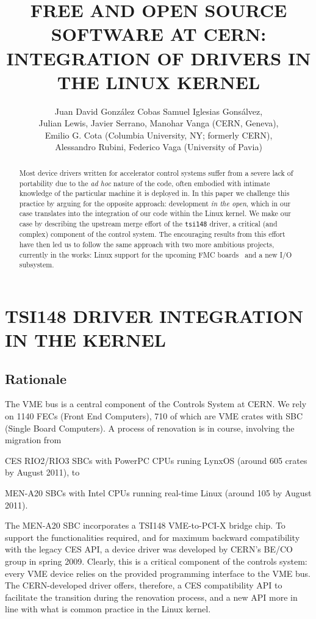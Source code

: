 \documentclass{JAC2003}
\title{%
    FREE AND OPEN SOURCE SOFTWARE AT CERN:\\
    INTEGRATION OF DRIVERS IN THE LINUX KERNEL}
\author{%
	Juan David Gonz\'alez Cobas Samuel Iglesias Gons\'alvez,\\
	Julian Lewis, Javier Serrano, Manohar Vanga (CERN, Geneva),\\ 
	Emilio G. Cota (Columbia University, NY; formerly CERN), \\
	Alessandro Rubini, Federico Vaga (University of Pavia)}
\begin{document}
\maketitle
\begin{abstract}
    Most device drivers written for accelerator control systems suffer from a
    severe lack of portability due to the \emph{ad hoc} nature of the code,
    often embodied with intimate knowledge of the particular machine it is
    deployed in.
    In this paper we challenge this practice by arguing for the opposite
    approach: development \emph{in the open}, which in our case translates
    into the integration of our code within the Linux kernel. We make our
    case by describing the upstream merge effort of the \texttt{tsi148}
    driver, a critical (and complex) component of the control system.
    The encouraging results from this effort have then led us to follow the
    same approach with two more ambitious projects, currently in the works:
    Linux support for the upcoming FMC boards~\cite{fpga-fmc,vita-fmc}
    and a new I/O subsystem.
\end{abstract}


\section{TSI148 DRIVER INTEGRATION IN THE KERNEL}
\subsection{Rationale}
The VME bus is a central component of the Controls System at CERN. We rely
on 1140 FECs (Front End Computers), 710 of which are VME crates with SBC
(Single Board Computers). A process of renovation is in course, involving
the migration from
\begin{Itemize}
\item CES RIO2/RIO3 SBCs with PowerPC CPUs runing LynxOS (around 605
    crates by August 2011), to
\item MEN-A20 SBCs with Intel CPUs running real-time Linux (around 105 by
    August 2011).
\end{Itemize}

The MEN-A20 SBC incorporates a TSI148 VME-to-PCI-X bridge chip.  To support
the functionalities required, and for maximum backward compatibility with
the legacy CES API, a device driver was developed by CERN's BE/CO group in
spring 2009. Clearly, this is a critical component of the controls system:
every VME device relies on the provided programming interface to the VME
bus. The CERN-developed driver offers, therefore, a CES compatibility API
to facilitate the transition during the renovation process, and a new API
more in line with what is common practice in the Linux kernel.
\end{document}
